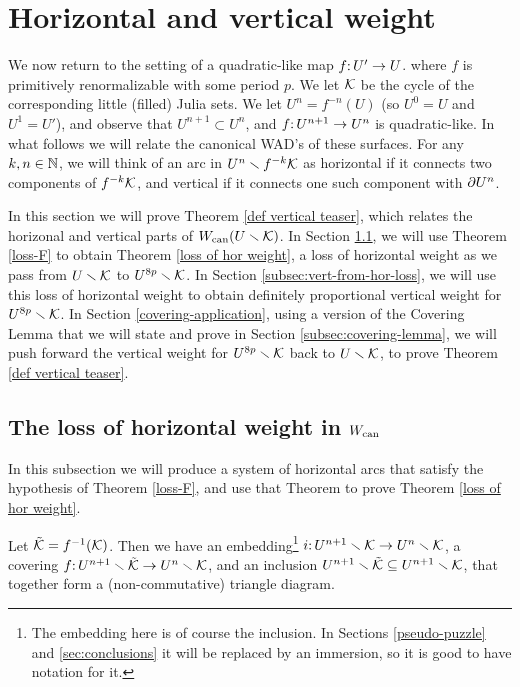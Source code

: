 \section{Horizontal and vertical weight} \label{sec:restriction} \label{sec:hor-vert}
We now return to the setting of a quadratic-like map $f\mathpunct: U'\to U$.
where $f$ is primitively renormalizable with some period $p$.
We let ${\mathcal K}$ be the cycle of the corresponding little (filled) Julia sets.
We let $U^n = f^{-n}(U)$ (so $U^0 = U$ and $U^1 = U'$),
and observe that $U^{n+1} \subset U^n$,
and $f\mathpunct: U^{n+1} \to U^n$ is quadratic-like.
In what follows we will relate the canonical WAD's of these surfaces.
For any $k, n \in {\Bbb N}$,
we will think of an arc in $U^n \smallsetminus f^{-k}{\mathcal K}$ as horizontal if it connects two components of $f^{-k}{\mathcal K}$,
and vertical if it connects one such component with $\partial U^n$. 



In this section we will prove Theorem \ref{def vertical teaser}, which relates the horizonal and vertical parts of $W_{\operatorname{can}}(U\smallsetminus{\mathcal K})$. 
In Section \ref{domination sec}, we will use Theorem \ref{loss-F} to obtain Theorem \ref{loss of hor weight}, 
a loss of horizontal weight as we pass from $U \smallsetminus {\mathcal K}$ to $U^{8p} \smallsetminus {\mathcal K}$. 
In Section \ref{subsec:vert-from-hor-loss}, we will use this loss of horizontal weight to obtain definitely proportional vertical weight for $U^{8p} \smallsetminus {\mathcal K}$.
In Section \ref{covering-application}, using a version of the Covering Lemma that we will state and prove in Section \ref{subsec:covering-lemma},
we will push forward the vertical weight for $U^{8p} \smallsetminus {\mathcal K}$ back to $U \smallsetminus {\mathcal K}$, to prove Theorem \ref{def vertical teaser}.
\subsection{The loss of horizontal weight in $W_{\mathrm{can}}$}\label{domination sec}
In this subsection we will produce a system of horizontal arcs that satisfy the hypothesis of Theorem \ref{loss-F}, 
and use that Theorem to prove Theorem \ref{loss of hor weight}. 

Let $\tilde {{\mathcal K}}=f^{-1}({\mathcal K})$.
Then we have an embedding\footnote{The embedding here is of course the inclusion. In Sections \ref{pseudo-puzzle} and \ref{sec:conclusions} it will be replaced by an immersion, so it is good to have notation for it.}
 $i\mathpunct: U^{n+1}\smallsetminus {\mathcal K} \to U^n\smallsetminus {\mathcal K}$,
a covering $f\mathpunct: U^{n+1}\smallsetminus \tilde {{\mathcal K}} \to U^n\smallsetminus {\mathcal K}$,
and an inclusion $U^{n+1}\smallsetminus \tilde {{\mathcal K}} \subseteq U^{n+1}\smallsetminus {\mathcal K}$,
that together form a (non-commutative) triangle diagram.

